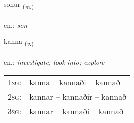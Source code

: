 \documentclass[frontgrid, backgrid]{flacards}\usepackage[]{graphicx}\usepackage[]{xcolor}
\begin{document}
\renewcommand{\blhead}{\vskip5pt {\small\bfseries\footnotesize Nafnorð | Noun }}
\renewcommand{\bcfoot}{\vskip5pt \hspace{2pt}{\small\bfseries\footnotesize 1K}}


{sonur \small{\textsubscript{(\textit{m.})}} \\[1ex] %
\textphonetic{[sɔːnʏr]} \\
en.: \emph{son} \\  [2ex]
\renewcommand*{\arraystretch}{0.8}
}

\renewcommand{\flhead}{\vskip5pt \fboxsep=0pt {\small\bfseries\footnotesize Sagnorð | Verb}}
\renewcommand{\fcfoot}{\vskip5pt \fboxsep=0pt \hspace{2pt}{\small\bfseries\footnotesize 1K}}

\renewcommand{\blhead}{\vskip5pt {\small\bfseries\footnotesize Sagnorð | Verb }}
\renewcommand{\bcfoot}{\vskip5pt \hspace{2pt}{\small\bfseries\footnotesize 1K}}


{kanna \small{\textsubscript{(\textit{v.})}} \\[1ex] %
\textphonetic{[kʰana]} \\
en.: \emph{investigate, look into; explore} \\  [2ex]
\renewcommand*{\arraystretch}{0.8}
\begin{tabular}{p{1cm}l}
\textsc{1sg}: & kanna -- kannaði -- kannað \\ 
\textsc{2sg}: & kannar -- kannaðir -- kannað \\ 
\textsc{3sg}: & kannar -- kannaði -- kannað \\ 
\end{tabular}
}

\renewcommand{\flhead}{\vskip5pt \fboxsep=0pt {\small\bfseries\footnotesize Nafnorð | Noun}}
\renewcommand{\fcfoot}{\vskip5pt \fboxsep=0pt \hspace{2pt}{\small\bfseries\footnotesize 1K}}
\end{document}
